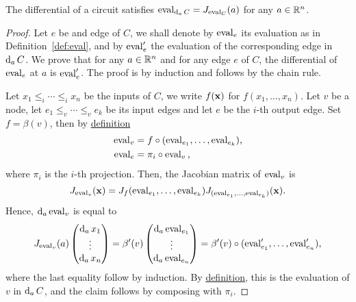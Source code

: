 \begin{proposition}
  The differential of a circuit satisfies $\operatorname{eval}_{\operatorname{d}_aC}=J_{\operatorname{eval}_C}(a)$ for any $a\in\mathbb{R}^n$.
\end{proposition}
\begin{proof}
  Let $e$ be and edge of $C$, we shall denote by $\operatorname{eval}_e$ its
  evaluation as in Definition~\ref{def:eval}, and by $\operatorname{eval}_e'$ the
  evaluation of the corresponding edge in $\operatorname{d}_a C$.  We prove that
  for any $a\in\mathbb{R}^n$ and for any edge $e$ of $C$, the differential of
  $\operatorname{eval}_e$ at $a$ is $\operatorname{eval}_e'$.  The proof is by induction and
  follows by the chain rule.

  Let $x_1\le_i\cdots\le_ix_n$ be the inputs of $C$, we write
  $f(\mathbf{x})$ for $f(x_1,\ldots,x_n)$.  Let $v$ be a node, let
  $e_1\le_v\cdots\le_ve_k$ be its input edges and let $e$ be the
  $i$-th output edge. Set $f=\beta(v)$, then by
  \hyperref[def:eval]{definition}
  \begin{equation}
    \label{eq:266}
    \begin{aligned}
      \operatorname{eval}_v &= f \circ (\operatorname{eval}_{e_1},\ldots,\operatorname{eval}_{e_k})\text{,}\\
      \operatorname{eval}_e &= \pi_i\circ\operatorname{eval}_v \text{,}
    \end{aligned}
  \end{equation}
  where $\pi_i$ is the $i$-th projection. Then, the Jacobian matrix of
  $\operatorname{eval}_v$ is
  \begin{equation}
    \label{eq:267}
    J_{\operatorname{eval}_v}(\mathbf{x}) =
    J_f(\operatorname{eval}_{e_1},\ldots,\operatorname{eval}_{e_k}) J_{(\operatorname{eval}_{e_1},\ldots,\operatorname{eval}_{e_k})} (\mathbf{x})
    \text{.}
  \end{equation}
  Hence, $\operatorname{d}_a \operatorname{eval}_v$ is equal to
  \begin{equation}
    \label{eq:268}
    J_{\operatorname{eval}_v}(a)
    \begin{pmatrix}
      \operatorname{d}_{a} x_1\\\vdots\\\operatorname{d}_{a} x_n
    \end{pmatrix} =
    \beta'(v)
    \begin{pmatrix}
      \operatorname{d}_a \operatorname{eval}_{e_1}\\\vdots\\\operatorname{d}_a \operatorname{eval}_{e_n}
    \end{pmatrix} =
    \beta'(v)\circ (\operatorname{eval}_{e_1}',\ldots,\operatorname{eval}_{e_n}')
    \text{,}
  \end{equation}
  where the last equality follow by induction. By
  \hyperref[def:eval]{definition}, this is the evaluation of $v$ in
  $\operatorname{d}_{a} C$, and the claim follows by composing with $\pi_i$.
\end{proof}

